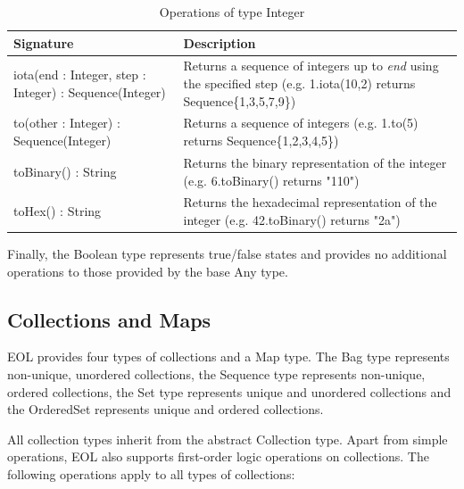 \begin{longtabu} {|p{6.5cm}|X|}
\caption{Operations of type Integer}
\label{tab:IntegerOperations}\\
\hline

    \textbf{Signature} & \textbf{Description} \\\hline

    iota(end : Integer, step : Integer) : Sequence(Integer) & Returns a sequence of integers up to \emph{end} using the specified step (e.g. 1.iota(10,2) returns Sequence\{1,3,5,7,9\})\\\hline
    
    to(other : Integer) : Sequence(Integer) & Returns a sequence of integers (e.g. 1.to(5) returns Sequence\{1,2,3,4,5\})\\\hline
    
    toBinary() : String & Returns the binary representation of the integer (e.g. 6.toBinary() returns "110")\\\hline
    
    toHex() : String & Returns the hexadecimal representation of the integer (e.g. 42.toBinary() returns "2a")\\\hline

\end{longtabu}

Finally, the Boolean type represents true/false states and provides no additional operations to those provided by the base Any type.

\subsection{Collections and Maps} 
\label{sec:Design.EOL.Collections}

EOL provides four types of collections and a Map type. The Bag type represents non-unique, unordered collections, the Sequence type represents non-unique, ordered collections, the Set type represents unique and unordered collections and the OrderedSet represents unique and ordered collections.

All collection types inherit from the abstract Collection type. Apart from simple operations, EOL also supports first-order logic operations on collections. The following operations apply to all types of collections:
\newpage

